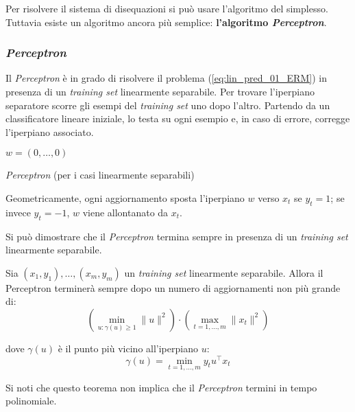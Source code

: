 Per risolvere il sistema di disequazioni si può usare l'algoritmo del
simplesso. Tuttavia esiste un algoritmo ancora più semplice: 
\textbf{l'algoritmo \textit{Perceptron}}.

\subsubsection{\textit{Perceptron}}
Il \textit{Perceptron} è in grado di risolvere il problema 
(\ref{eq:lin_pred_01_ERM}) in presenza di un \textit{training set} 
linearmente separabile. Per trovare l'iperpiano separatore scorre gli esempi
del \textit{training set} uno dopo l'altro. Partendo da un classificatore
lineare iniziale, lo testa su ogni esempio e, in caso di errore, corregge
l'iperpiano associato.

\begin{algorithm}[h]
   \DontPrintSemicolon
   $w=(0,\dots,0)$\;
   \caption{\textit{Perceptron} (per i casi linearmente separabili)}
\end{algorithm}

Geometricamente, ogni aggiornamento sposta l'iperpiano $w$ verso $x_t$ se
$y_t=1$; se invece $y_t=-1$, $w$ viene allontanato da $x_t$.

Si può dimostrare che il \textit{Perceptron} termina sempre in presenza
di un \textit{training set} linearmente separabile.

\begin{theorem}
   Sia $(x_1,y_1),\dots,(x_m,y_m)$ un \textit{training set} linearmente
   separabile. Allora il Perceptron terminerà sempre dopo un numero di
   aggiornamenti non più grande di:
   $$ \left(\min_{\displaystyle u:\gamma(u)\geq1} \|u\|^2 \right)\cdot
      \left(\max_{\displaystyle t=1,\dots,m}\|x_t\|^2\right) $$

   dove $\gamma(u)$ è il punto più vicino all'iperpiano $u$:
   $$ \gamma(u) = \min_{t=1,\dots,m} y_t u^\top x_t $$
\end{theorem}

Si noti che questo teorema non implica che il \textit{Perceptron} termini
in tempo polinomiale.

